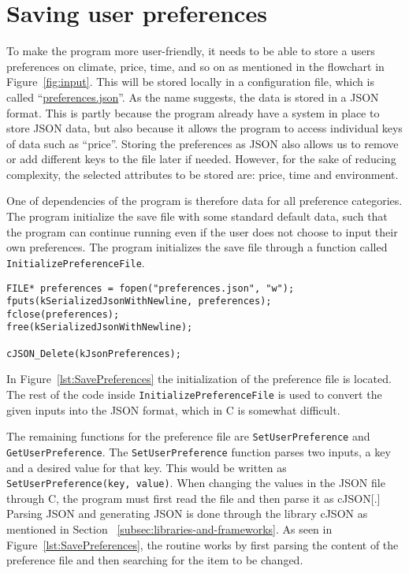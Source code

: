 \section{Saving user preferences}\label{sec:saving-user-preferences}

To make the program more user-friendly, it needs to be able to store a users preferences on climate, price,
time, and so on as mentioned in the flowchart in Figure~\ref{fig:input}.
This will be stored locally in a configuration file, which is called ``\url{preferences.json}''.
As the name suggests, the data is stored in a JSON format.
This is partly because the program already have a system in place to store JSON data, but also because it allows the
program to access individual keys of data such as ``price''.
Storing the preferences as JSON also allows us to remove or add different keys to the file later if needed.
However, for the sake of reducing complexity, the selected attributes to be stored are: price, time and environment.

One of dependencies of the program is therefore data for all preference categories.
The program initialize the save file with some standard default data, such that the program can continue running even if
the user does not choose to input their own preferences.
The program initializes the save file through a function called \texttt{InitializePreferenceFile}.

\begin{lstlisting}[label={lst:SavePreferences}, caption={Saving preferences to file.}, captionpos=b]
FILE* preferences = fopen("preferences.json", "w");
fputs(kSerializedJsonWithNewline, preferences);
fclose(preferences);
free(kSerializedJsonWithNewline);

cJSON_Delete(kJsonPreferences);
\end{lstlisting}

In Figure~\ref{lst:SavePreferences} the initialization of the preference file is located.
The rest of the code inside \texttt{InitializePreferenceFile} is used to convert the given inputs into the JSON format,
which in C is somewhat difficult.

The remaining functions for the preference file are \texttt{SetUserPreference} and \texttt{GetUserPreference}.
The \texttt{SetUserPreference} function parses two inputs, a key and a desired value for that key.
This would be written as \texttt{SetUserPreference(key, value)}.
When changing the values in the JSON file through C, the program must first read the file and then parse it as cJSON[.]
Parsing JSON and generating JSON is done through the library cJSON as mentioned in Section
~\ref{subsec:libraries-and-frameworks}.
As seen in Figure~\ref{lst:SavePreferences}, the routine works by first parsing the content of the preference file and
then searching for the item to be changed.

